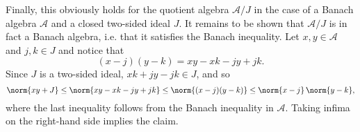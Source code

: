 \documentclass[article, a4paper, 11pt, oneside]{memoir}
\numberwithin{equation}{chapter}
\newcommand{\calA}{\mathcal{A}}
\begin{document}
\begin{remark}
    Finally, this obviously holds for the quotient algebra $\calA/J$ in the case of a Banach algebra $\calA$ and a closed two-sided ideal $J$. It remains to be shown that $\calA/J$ is in fact a Banach algebra, i.e. that it satisfies the Banach inequality. Let $x,y \in \calA$ and $j,k \in J$ and notice that
    \begin{equation*}
        (x-j)(y-k)
            = xy - xk - jy + jk.
    \end{equation*}
    Since $J$ is a two-sided ideal, $xk + jy - jk \in J$, and so
    \begin{equation*}
        \norm{xy + J}
            \leq \norm{xy - xk - jy + jk}
            \leq \norm{(x-j)(y-k)}
            \leq \norm{x-j} \, \norm{y-k},
    \end{equation*}
    where the last inequality follows from the Banach inequality in $\calA$. Taking infima on the right-hand side implies the claim.
\end{remark}
\end{document}

